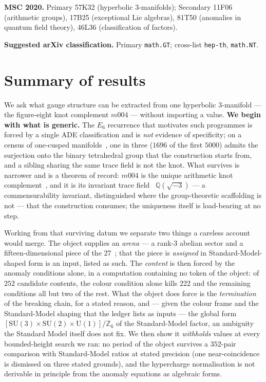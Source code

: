 \documentclass[11pt,a4paper]{article}
\theoremstyle{definition}
\theoremstyle{remark}
\newcommand{\Q}{\mathbb{Q}}
\newcommand{\Z}{\mathbb{Z}}
\begin{document}
\smallskip
\noindent\textbf{MSC 2020.} Primary 57K32 (hyperbolic 3-manifolds); Secondary 11F06 (arithmetic
groups), 17B25 (exceptional Lie algebras), 81T50 (anomalies in quantum field theory), 46L36
(classification of factors).

\smallskip
\noindent\textbf{Suggested arXiv classification.} Primary \texttt{math.GT}; cross-list
\texttt{hep-th}, \texttt{math.NT}.
\normalsize

\section*{Summary of results}\label{sec:summary}
We ask what gauge structure can be extracted from one hyperbolic 3-manifold --- the figure-eight
knot complement $m004$ --- without importing a value. \textbf{We begin with what is generic.} The
$E_6$ recurrence that motivates such programmes is forced by a single ADE classification and is
\emph{not} evidence of specificity; on a census of one-cusped manifolds~\cite{snappy,chw}, one in three ($1696$ of the first $5000$) admits the
surjection onto the binary tetrahedral group that the construction starts from, and a sibling
sharing the same trace field is not the knot. What survives is narrower and is a theorem of record:
$m004$ is the unique arithmetic knot complement~\cite{reid}, and it is its invariant trace field~\cite{maclachlanreid} $\Q(\sqrt{-3})$
--- a commensurability invariant, distinguished where the group-theoretic scaffolding is not --- that the construction consumes; the
uniqueness itself is load-bearing at no step.

Working from that surviving datum we separate two things a careless account would merge. The object
supplies an \emph{arena} --- a rank-3 abelian sector and a fifteen-dimensional piece of the $27$~\cite{slansky}; that the piece is
\emph{assigned} in Standard-Model-shaped form is an input, listed as such. The \emph{content} is then forced by the anomaly conditions alone, in a computation
containing no token of the object: of $252$ candidate contents, the colour condition alone kills $222$ and the remaining
conditions all but two of the rest. What the object does force is the \emph{termination} of the breaking chain, for
a stated reason, and --- given the colour frame and the Standard-Model shaping that the ledger lists as inputs --- the global form
$[\mathrm{SU}(3)\times\mathrm{SU}(2)\times\mathrm{U}(1)]/\Z_6$ of the Standard-Model factor, an ambiguity the Standard Model
itself does not fix. We then show it
\emph{withholds} values at every bounded-height search we ran: no period of the object survives a $352$-pair comparison with Standard-Model ratios at stated precision (one near-coincidence is dismissed on
three stated grounds), and the hypercharge normalisation is not derivable in principle from the anomaly
equations as algebraic forms.
\end{document}
